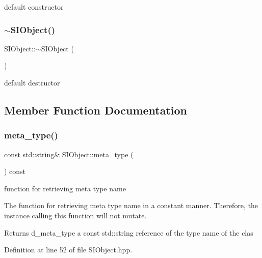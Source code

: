 default constructor 

\mbox{\label{class_s_i_object_a3b91c3651ce742f783f9cb48117d28c3}} 
\subsubsection{\texorpdfstring{$\sim$SIObject()}{~SIObject()}}
{\footnotesize\ttfamily S\+I\+Object\+::$\sim$\+S\+I\+Object (\begin{DoxyParamCaption}{ }\end{DoxyParamCaption})\hspace{0.3cm}{\ttfamily [default]}}



default destructor 



\subsection{Member Function Documentation}
\mbox{\label{class_s_i_object_a0edd00788cf10f707b47f080c69773f9}} 
\subsubsection{\texorpdfstring{meta\_type()}{meta\_type()}}
{\footnotesize\ttfamily const std\+::string\& S\+I\+Object\+::meta\+\_\+type (\begin{DoxyParamCaption}{ }\end{DoxyParamCaption}) const\hspace{0.3cm}{\ttfamily [inline]}}



function for retrieving meta type name 

The function for retrieving meta type name in a constant manner. Therefore, the instance calling this function will not mutate. \begin{DoxyReturn}{Returns}
d\+\_\+meta\+\_\+type a const std\+::string reference of the type name of the clas 
\end{DoxyReturn}


Definition at line 52 of file S\+I\+Object.\+hpp.



